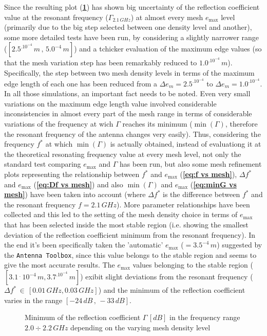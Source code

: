 \documentclass[10 pt,a4paper,twocolumn]{article}
\begin{document}
{Since the resulting plot  (\textbf{\cref{fig:first mesh test}}) has shown big uncertainty of the reflection coefficient value at the resonant frequency ($\Gamma_{2.1\,GHz}$) at almost every mesh $e_{\max}$ level (primarily due to the big step selected between one density level and another), some more detailed tests have been run, by considering a slightly narrower range ($[2.5^.10^{-4}\,m\,,\,5.0^{-4}\,m]$) and a tchicker evaluation of the maximum edge values (so that the mesh variation step has been remarkably reduced to $1.0^.10^{-4}\,m$). Specifically, the step between two mesh density levels in terms of the maximum edge length of each one has been reduced from a $\Delta e_m=2.5^.10^{-4}$ to $\Delta e_m=1.0^.10^{-4}$. In all those simulations, an important fact needs to be noted. Even very small variations on the maximum edge length value involved considerable inconsistencies in almost every part of the mesh range in terms of considerable variations of the frequency at wich $\Gamma$ reaches its minimum ($\min(\Gamma)$, therefore the resonant frequency of the antenna changes very easily).  
Thus, considering the frequency $f^*$ at which $\min(\Gamma)$ is actually obtained, instead of evaluationg it at the theoretical resonating frequency value at every mesh level, not only the standard test comparing $e_{\max}$ and $\Gamma$ has been run, but also some mesh refinement plots representing the relationship between $f^*$ and $e_{\max}$ (\textbf{\cref{eq:f vs mesh}}), $\Delta f^*$ and $e_{\max}$ (\textbf{\cref{eq:Df vs mesh}}) and also $\min(\Gamma)$ and $e_{\max}$ (\textbf{\cref{eq:minG vs mesh}}) have been taken into account (where $\Delta f^*$ is the difference between $f^*$ and the resonant frequency $f=2.1\,GHz$). More parameter relationships have been collected and this led to the setting of the mesh density choice in terms of $e_{\max}$ that has been selected inside the most stable region (i.e. showing the smallest deviation of the reflection coefficient minimum from the resonant frequency). In the end it's been specifically taken the 'automatic' $e_{\max}$ ($=3.5^{-4}\,m$) suggested by the \texttt{Antenna Toolbox}, since this value  belongs to the stable region and seems to give the most accurate results. The $e_{\max}$ values belonging to the stable region ($[3.1\,^.\,10^{-4}\,m,3.7^.10^{-4}\,m]$) exibit slight deviations from the resonant frequency ($\Delta f^*\,\in\,[0.01\,GHz,0.03\,GHz]$) and the minimum of the reflection coefficient varies in the range $[-24\,dB\,,\,-33\,dB]$. 
\begin{figure}[bt!]
	\def\svgwidth{\linewidth}
	\tiny{}
	\hfill
	\caption{{Minimum of the reflection coefficient $\Gamma\, [dB]$ in the frequency range $2.0\div 2.2\,GHz$ depending on the varying mesh density level}}
	\label{fig:first mesh test}
\end{figure}


}
\end{document}
